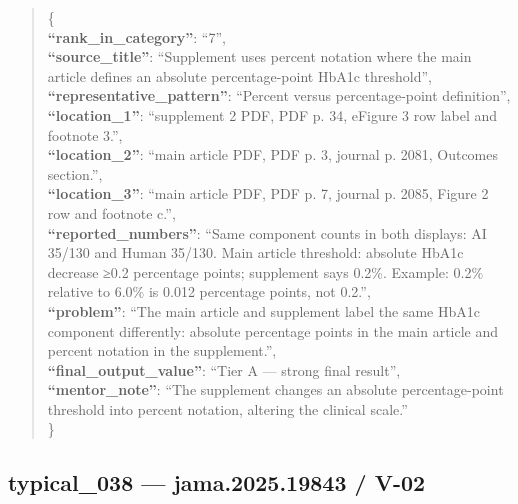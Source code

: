 \documentclass[
  letterpaper,
  9pt]{extreport}
\begin{document}
\begin{quote}
\{\\
\textbf{``rank\_in\_category''}: ``7'',\\
\textbf{``source\_title''}: ``Supplement uses percent notation where the
main article defines an absolute percentage-point HbA1c threshold'',\\
\textbf{``representative\_pattern''}: ``Percent versus percentage-point
definition'',\\
\textbf{``location\_1''}: ``supplement 2 PDF, PDF p. 34, eFigure 3 row
label and footnote 3.'',\\
\textbf{``location\_2''}: ``main article PDF, PDF p. 3, journal p. 2081,
Outcomes section.'',\\
\textbf{``location\_3''}: ``main article PDF, PDF p. 7, journal p. 2085,
Figure 2 row and footnote c.'',\\
\textbf{``reported\_numbers''}: ``Same component counts in both
displays: AI 35/130 and Human 35/130. Main article threshold: absolute
HbA1c decrease ≥0.2 percentage points; supplement says 0.2\%. Example:
0.2\% relative to 6.0\% is 0.012 percentage points, not 0.2.'',\\
\textbf{``problem''}: ``The main article and supplement label the same
HbA1c component differently: absolute percentage points in the main
article and percent notation in the supplement.'',\\
\textbf{``final\_output\_value''}: ``Tier A --- strong final result'',\\
\textbf{``mentor\_note''}: ``The supplement changes an absolute
percentage-point threshold into percent notation, altering the clinical
scale.''\\
\}
\end{quote}

\hypertarget{typical_038--jama202519843--v-02}{%
\subsection{typical\_038 --- jama.2025.19843 /
V-02}\label{typical_038--jama202519843--v-02}}
\end{document}
